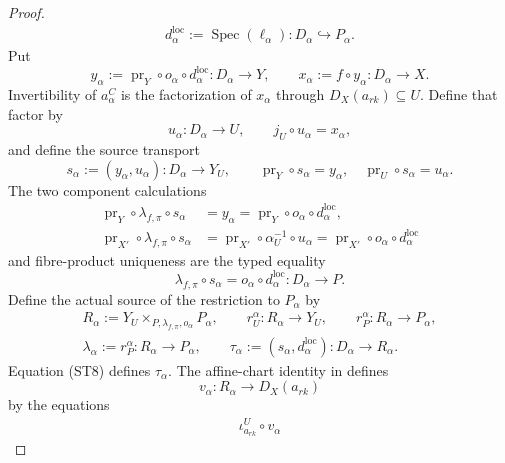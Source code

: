 \begin{proof}
\[\begin{gathered}
    d^{\mathrm{loc}}_\alpha:=\operatorname{Spec}(\ell_\alpha)
      \colon D_\alpha\hookrightarrow P_\alpha.
  \end{gathered}                                                  \tag{ST6}
  \]
  Put
  \[
    y_\alpha:=\operatorname{pr}_Y\circ o_\alpha\circ
      d^{\mathrm{loc}}_\alpha\colon D_\alpha\to Y,
    \qquad
    x_\alpha:=f\circ y_\alpha\colon D_\alpha\to X.
  \]
  Invertibility of $a^C_\alpha$ is the factorization of $x_\alpha$ through
  $D_X(a_{rk})\subseteq U$.  Define that factor by
  \[
    u_\alpha\colon D_\alpha\to U,
    \qquad
    j_U\circ u_\alpha=x_\alpha,
  \]
  and define the source transport
  \[
    s_\alpha:=(y_\alpha,u_\alpha)
      \colon D_\alpha\longrightarrow Y_U,
    \qquad
    \operatorname{pr}_Y\circ s_\alpha=y_\alpha,
    \quad
    \operatorname{pr}_U\circ s_\alpha=u_\alpha.               \tag{ST7}
  \]
  The two component calculations
  \[
  \begin{aligned}
    \operatorname{pr}_Y\circ\lambda_{f,\pi}\circ s_\alpha
      &=y_\alpha
       =\operatorname{pr}_Y\circ o_\alpha\circ d^{\mathrm{loc}}_\alpha,\\
    \operatorname{pr}_{X'}\circ\lambda_{f,\pi}\circ s_\alpha
      &=\operatorname{pr}_{X'}\circ\alpha_U^{-1}\circ u_\alpha
       =\operatorname{pr}_{X'}\circ o_\alpha\circ
          d^{\mathrm{loc}}_\alpha
  \end{aligned}
  \]
  and fibre-product uniqueness are the typed equality
  \[
    \lambda_{f,\pi}\circ s_\alpha
      =o_\alpha\circ d^{\mathrm{loc}}_\alpha
      \colon D_\alpha\to P.                                    \tag{ST8}
  \]
  Define the actual source of the restriction to $P_\alpha$ by
  \[
  \begin{gathered}
    R_\alpha:=Y_U\times_{P,\lambda_{f,\pi},o_\alpha}P_\alpha,
    \qquad
    r_U^\alpha\colon R_\alpha\to Y_U,
    \qquad
    r_P^\alpha\colon R_\alpha\to P_\alpha,\\
    \lambda_\alpha:=r_P^\alpha\colon R_\alpha\to P_\alpha,
    \qquad
    \tau_\alpha:=(s_\alpha,d^{\mathrm{loc}}_\alpha)
      \colon D_\alpha\longrightarrow R_\alpha.
  \end{gathered}                                                  \tag{ST9}
  \]
  Equation (ST8) defines $\tau_\alpha$.  The affine-chart identity in
  defines
  \[
    v_\alpha\colon R_\alpha\longrightarrow D_X(a_{rk})
  \]
  by the equations
  \[
  \begin{gathered}
    \iota_{a_{rk}}^U\circ v_\alpha

\end{gathered}\]
\end{proof}
